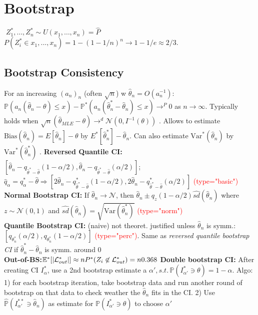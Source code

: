 \section*{Bootstrap}
$\; Z^*_1,\dots, Z^*_n\sim U(x_1,\dots,x_n)=\hat{P}$\\
$P(Z^*_i\in x_1, ..., x_n)=1-(1-1/n)^n \rightarrow 1-1/e\approx 2/3$.
\subsection*{Bootstrap Consistency}
For an increasing $(a_n)_n$ (often $\sqrt{n}$) w $\hat \theta_n=O(a_n^{-1})$:
$\mathbb{P}(a_n(\hat \theta_n - \theta) \leq x) - \mathbb{P}^*(a_n(\hat \theta_n^* - \hat \theta_n) \leq x) \to^P 0$ as $n\to \infty$. Typically holds when $\sqrt{n}(\hat \theta_{MLE} - \theta)\rightarrow^d \mathcal{N}(0,I^{-1}(\theta))$ . Allows to estimate $\text{Bias}(\hat \theta_n) = E[\hat \theta_n] - \theta$ by $E^*[\hat \theta^*_n] - \hat \theta_n$. Can also estimate $\text{Var}^*(\hat\theta_n)$ by $\text{Var}^*(\hat\theta^*_n)$ .
\textbf{Reversed Quantile CI:} $[\hat \theta_n - q_{\hat \theta^* - \hat \theta}(1- \alpha / 2), \hat \theta_n - q_{\hat \theta^* - \hat \theta}(\alpha / 2)]$; $\hat{q}_{\alpha}=q^*_{\alpha}-\hat{\theta}\Rightarrow [2\hat \theta_n - q^*_{\hat \theta^* - \hat \theta}(1- \alpha / 2), 2\hat \theta_n - q^*_{\hat \theta^* - \hat \theta}(\alpha / 2)]$ \textcolor{red}{(type="basic")}\\
\textbf{Normal Bootstrap CI:} If $\hat\theta_n\rightarrow\mathcal{N}$, then $\hat\theta_n \pm q_z(1-\alpha / 2)\hat{sd}(\hat\theta_n)$ where $z \sim \mathcal{N}(0,1)$ and $\hat{sd}(\hat\theta_n)=\sqrt {{\text{Var}(\hat\theta_n^*)}}$ \textcolor{red}{(type="norm")}\\ \textbf{Quantile Bootstrap CI:} (naive) not theoret. justified unless $\hat\theta_n$ is symm.:
$[q_{\theta_n^*}(\alpha / 2), q_{\theta_n^*}(1-\alpha / 2)]$ \textcolor{red}{(type="perc")}. Same as \textit{reversed quantile bootstrap CI} if $\hat\theta_n^* - \hat\theta_n$ is symm. around 0\\
\textbf{Out-of-BS:}$\mathbb{E}^*[|\mathcal{L}^*_{out}|]\approx nP^*(Z_i\not\in\mathcal{L}^*_{out})=n0.368$
\textbf{Double bootstrap CI:} After creating CI $I_\alpha^*$, use a 2nd bootstrap estimate a $\alpha',s.t.\,\mathbb{P}(I_{\alpha'}^* \ni \theta) = 1-\alpha$. Algo: 1) for each bootstrap iteration, take bootstrap data and run another round of bootstrap on that data to check weather the $\hat\theta_n$ fits in the CI. 2) Use $\hat{\mathbb{P}}(I_{\alpha'}^{**} \ni \hat{\theta}_n)$ as estimate for $\mathbb{P}(I_{\alpha'}^* \ni \theta)$ to choose $\alpha'$ \\
